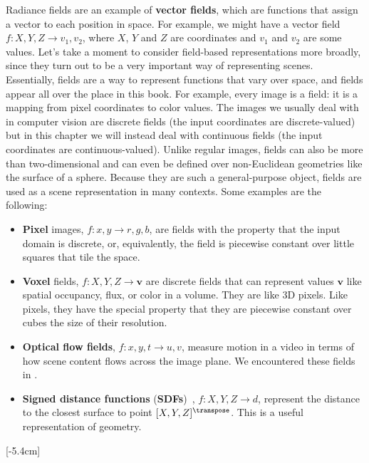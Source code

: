 Radiance fields are an example of \textbf{vector fields}, which are functions that assign a vector to each position in space. For example, we might have a vector field $f: X, Y, Z \rightarrow v_1, v_2$, where $X$, $Y$ and $Z$ are coordinates and $v_1$ and $v_2$ are some values. Let's take a moment to consider
field-based representations more broadly, since they turn out to be a very important way of representing scenes. Essentially, fields are a way to represent functions that vary over space, and fields appear all over the place in this book. For example, every image is a field: it is a mapping from pixel coordinates to color values. The images we usually deal with in computer vision are discrete fields (the input coordinates are discrete-valued) but in this chapter we will instead deal with continuous fields (the input coordinates are continuous-valued). Unlike regular images, fields can also be more than two-dimensional and can even be defined over non-Euclidean geometries like the surface of a sphere. Because they are such a general-purpose object, fields are used as a scene representation in many contexts. Some examples are the following:
\begin{itemize}
    \item {}\textbf{Pixel} images, $f: x, y \rightarrow r, g, b$, are fields with the property that the input domain is discrete, or, equivalently, the field is piecewise constant over little squares that tile the space.
    \item {}\textbf{Voxel} fields, $f: X,Y,Z \rightarrow \mathbf{v}$ are discrete fields that can represent values $\mathbf{v}$ like spatial occupancy, flux, or color in a volume. They are like 3D pixels. Like pixels, they have the special property that they are piecewise constant over cubes the size of their resolution.
    \item {}\textbf{Optical flow fields}, $f: x, y, t \rightarrow u, v$, measure motion in a video in terms of how scene content flows across the image plane. We encountered these fields in \chap{\ref{chapter:3D_motion_and_its_2D_projection}}.
    \item {}\textbf{Signed distance functions} (\textbf{SDFs})~\cite{curless1996volumetric}, $f: X,Y,Z \rightarrow d$, represent the distance to the closest surface to point $[X,Y,Z]^\transpose$. This is a useful representation of geometry.
\end{itemize}
[-5.4cm]

